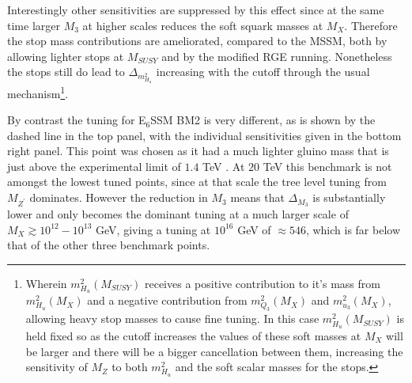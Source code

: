 \documentclass[preprint,amsmath,amssymb,aps,superscriptaddress,prd,
showpacs,floatfix,nofootinbib]{revtex4-1}
\begin{document}
Interestingly other sensitivities are suppressed by this effect since
at the same time larger $M_3$ at higher scales reduces the soft squark
masses at $M_X$.  Therefore the stop mass contributions are
ameliorated, compared to the MSSM, both by allowing lighter stops at
$M_{SUSY}$ and by the modified RGE running.  Nonetheless the stops
still do lead to $\Delta_{m_{H_u}^2}$ increasing with the cutoff
through the usual mechanism\footnote{Wherein $m_{H_u}^2(M_{SUSY})$
receives a positive contribution to it's mass from $m_{H_u}^2(M_X)$
and a negative contribution from $m_{Q_3}^2(M_X)$ and
$m_{u_3}^2(M_X)$, allowing heavy stop masses to cause fine
tuning.  In this case $m_{H_u}^2(M_{SUSY})$ is held fixed so as the
cutoff increases the values of these soft masses at $M_X$ will be
larger and there will be a bigger cancellation between them,
increasing the sensitivity of $M_Z$ to both $m_{H_u}^2$ and the soft
scalar masses for the stops.}.

By contrast the tuning for E$_6$SSM BM2 is very different, as is shown
by the dashed line in the top panel, with the individual sensitivities given
in the bottom right panel.  This point was chosen as it had a much lighter
gluino mass that is just above the experimental limit of $1.4$ TeV
\cite{Aad:2014lra}.  At $20$ TeV this benchmark is not amongst the
lowest tuned points, since at that scale the tree level tuning from
$M_{Z^\prime}$ dominates.  However the reduction in $M_3$ means that
$\Delta_{M_3}$ is substantially lower and only becomes the dominant
tuning at a much larger scale of $M_X \gtrsim 10^{12} - 10^{13}$ GeV,
giving a tuning at $10^{16}$ GeV of $\approx 546$, which is far below
that of the other three benchmark points.
\end{document}
